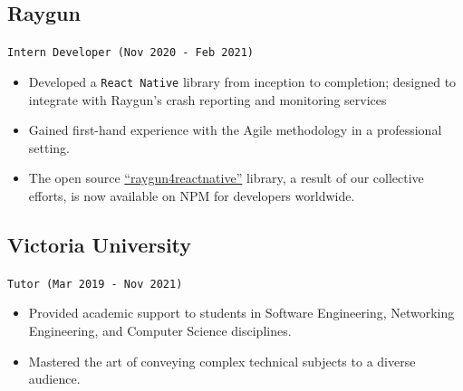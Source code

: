 \documentclass[a4paper, 10pt]{article}
\newcommand{\code}[1]{\mbox{\textcolor{code}{\texttt{#1}}}}
\begin{document}
\begin{multicols*}{2}
	\subsection{Raygun}
	\texttt{Intern Developer (Nov 2020 - Feb 2021)}
	\begin{itemize}[itemsep=0pt, leftmargin=0pt]
		\item Developed a \code{React Native} library from inception to completion; designed to integrate with Raygun's crash reporting and monitoring services
		\item Gained first-hand experience with the Agile methodology in a professional setting.
		\item The open source \href{https://www.npmjs.com/package/raygun4reactnative}{“raygun4reactnative”} library, a result of our collective efforts, is now available on NPM for developers worldwide.
	\end{itemize}
	\subsection{Victoria University}
	\texttt{Tutor (Mar 2019 - Nov 2021)}
	\begin{itemize}[itemsep=0pt, leftmargin=0pt]
		\item Provided academic support to students in Software Engineering, Networking Engineering, and Computer Science disciplines.
		\item Mastered the art of conveying complex technical subjects to a diverse audience.
	\end{itemize}
\end{multicols*}
\end{document}
